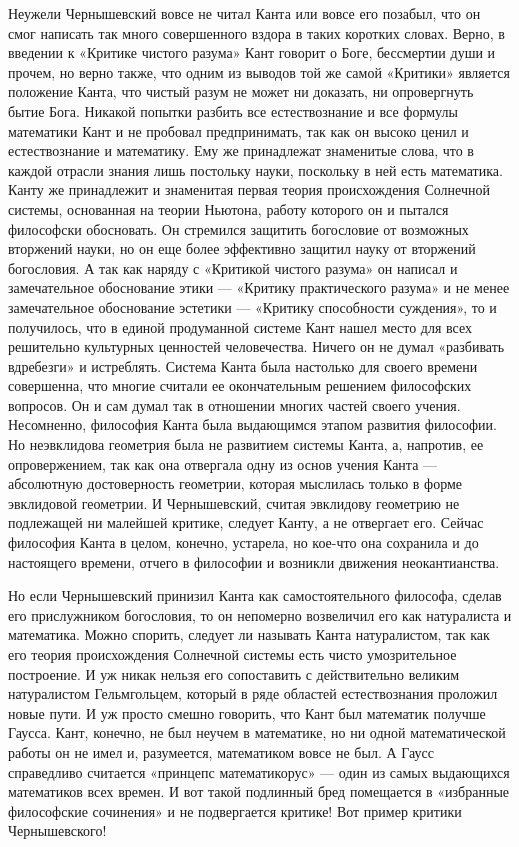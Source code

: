 Неужели Чернышевский вовсе  не читал Канта или вовсе  его позабыл, что
он  смог  написать так  много  совершенного  вздора в  таких  коротких
словах. Верно,  в введении к  «Критике чистого разума» Кант  говорит о
Боге, бессмертии души  и прочем, но верно также, что  одним из выводов
той же самой  «Критики» является положение Канта, что  чистый разум не
может ни доказать, ни опровергнуть бытие Бога. Никакой попытки разбить
все  естествознание  и  все  формулы математики  Кант  и  не  пробовал
предпринимать, так как он высоко  ценил и естествознание и математику.
Ему же принадлежат знаменитые слова,  что в каждой отрасли знания лишь
постольку науки, поскольку в ней есть математика. Канту же принадлежит
и знаменитая первая теория происхождения Солнечной системы, основанная
на теории Ньютона, работу которого он и пытался философски обосновать.
Он стремился защитить  богословие от возможных вторжений  науки, но он
еще  более эффективно  защитил науку  от вторжений  богословия. А  так
как  наряду с  «Критикой чистого  разума» он  написал и  замечательное
обоснование  этики  ---  «Критику  практического разума»  и  не  менее
замечательное обоснование эстетики --- «Критику способности суждения»,
то и получилось, что в единой продуманной системе Кант нашел место для
всех решительно культурных ценностей  человечества. Ничего он не думал
«разбивать  вдребезги»  и  истреблять. Система  Канта  была  настолько
для  своего времени  совершенна, что  многие считали  ее окончательным
решением философских вопросов.  Он и сам думал так  в отношении многих
частей  своего учения.  Несомненно,  философия  Канта была  выдающимся
этапом развития философии. Но  неэвклидова геометрия была не развитием
системы Канта,  а, напротив, ее  опровержением, так как  она отвергала
одну  из основ  учения Канта  --- абсолютную  достоверность геометрии,
которая мыслилась только в форме эвклидовой геометрии. И Чернышевский,
считая эвклидову геометрию не  подлежащей ни малейшей критике, следует
Канту, а  не отвергает его.  Сейчас философия Канта в  целом, конечно,
устарела, но кое-что  она сохранила и до настоящего  времени, отчего в
философии и возникли движения неокантианства.

Но  если Чернышевский  принизил Канта  как самостоятельного  философа,
сделав его прислужником богословия, то он непомерно возвеличил его как
натуралиста  и математика.  Можно спорить,  следует ли  называть Канта
натуралистом, так как его  теория происхождения Солнечной системы есть
чисто  умозрительное построение.  И  уж никак  нельзя его  сопоставить
с  действительно великим  натуралистом  Гельмгольцем,  который в  ряде
областей  естествознания  проложил  новые  пути. И  уж  просто  смешно
говорить, что Кант был математик получше Гаусса. Кант, конечно, не был
неучем в математике,  но ни одной математической работы он  не имел и,
разумеется, математиком  вовсе не  был. А Гаусс  справедливо считается
«принцепс  математикорус» ---  один  из  самых выдающихся  математиков
всех  времен.  И вот  такой  подлинный  бред помещается  в  «избранные
философские сочинения»  и не подвергается критике!  Вот пример критики
Чернышевского!


